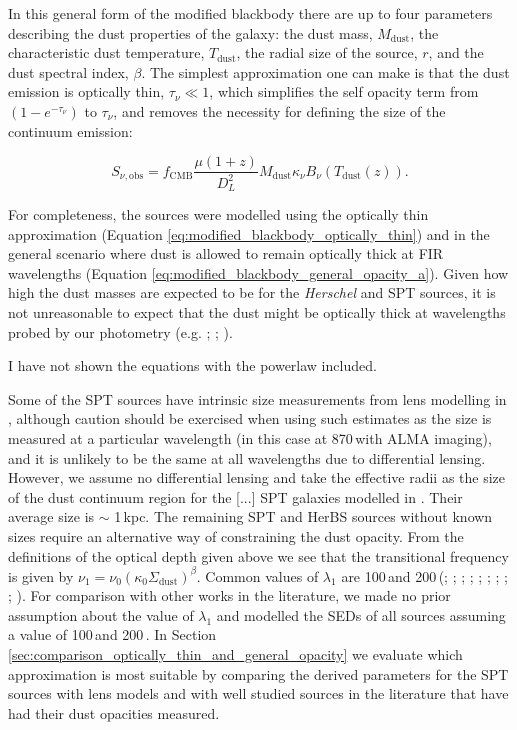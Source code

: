 In this general form of the modified blackbody there are up to four parameters describing the dust properties of the galaxy: the dust mass, $M_{\textrm{dust}}$, the characteristic dust temperature, $T_{\textrm{dust}}$, the radial size of the source, $r$, and the dust spectral index, $\beta$. The simplest approximation one can make is that the dust emission is optically thin, $\tau_\nu \ll 1$, which simplifies the self opacity term from $(1 - e^{-\tau_\nu})$ to $\tau_\nu$, and removes the necessity for defining the size of the continuum emission:

\begin{equation}
	S_{\nu, \textrm{obs}} = f_{\textrm{CMB}}\frac{\mu (1+z)}{D_L^2}M_{\textrm{dust}}\kappa_\nu B_\nu(T_{\textrm{dust}}(z)).
	\label{eq:modified_blackbody_optically_thin}
\end{equation}

For completeness, the sources were modelled using the optically thin approximation (Equation \ref{eq:modified_blackbody_optically_thin}) and in the general scenario where dust is allowed to remain optically thick at FIR wavelengths (Equation \ref{eq:modified_blackbody_general_opacity_a}). Given how high the dust masses are expected to be for the \textit{Herschel} and SPT sources, it is not unreasonable to expect that the dust might be optically thick at wavelengths probed by our photometry (e.g. \citealt{Conley_2011}; \citealt{Casey_2019}; \citealt{Cortzen_2020}). 

{\color{red} I have not shown the equations with the powerlaw included.}

Some of the SPT sources have intrinsic size measurements from lens modelling in \citealt{Spilker_2016}, although caution should be exercised when using such estimates as the size is measured at a particular wavelength (in this case at 870\,\micron with ALMA imaging), and it is unlikely to be the same at all wavelengths due to differential lensing. However, we assume no differential lensing and take the effective radii as the size of the dust continuum region for the [...] SPT galaxies modelled in \citealt{Spilker_2016}. Their average size is $\sim$ 1\,kpc. The remaining SPT and HerBS sources without known sizes require an alternative way of constraining the dust opacity. From the definitions of the optical depth given above we see that the transitional frequency is given by $\nu_1 = \nu_0(\kappa_0 \Sigma_{\textrm{dust}})^\beta$. Common values of $\lambda_1$ are 100\,\micron and 200\,\micron (\citealt{Blain_2003}; \citealt{Draine_2006}; \citealt{Conley_2011}; \citealt{Rangwala_2011}; \citealt{Greve_2012}; \citealt{Casey_2014a}; \citealt{Spilker_2016}; \citealt{Casey_2019}; \citealt{Cooper_2022}; \citealt{Drew_2022}). For comparison with other works in the literature, we made no prior assumption about the value of $\lambda_1$ and modelled the SEDs of all sources assuming a value of 100\,\micron and 200\,\micron. In Section \ref{sec:comparison_optically_thin_and_general_opacity} we evaluate which approximation is most suitable by comparing the derived parameters for the SPT sources with lens models and with well studied sources in the literature that have had their dust opacities measured.

